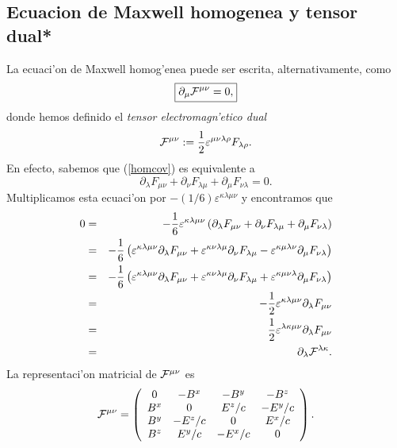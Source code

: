 \subsection{Ecuacion de Maxwell homogenea y tensor dual*}
La ecuaci'on de Maxwell homog'enea puede ser escrita, alternativamente, como
\begin{equation}
\boxed{\partial_\mu {\cal F}^{\mu\nu}=0,}
\end{equation}
donde hemos definido el \textit{tensor electromagn'etico dual}
\begin{equation}
{\cal F}^{\mu\nu}:=\frac{1}{2}\varepsilon^{\mu\nu\lambda\rho}F_{\lambda\rho} .
\end{equation}
En efecto, sabemos que (\ref{homcov}) es equivalente a
\begin{equation}
\partial_{\lambda}F_{\mu\nu}+\partial_{\nu}F_{\lambda\mu}+\partial_\mu 
F_{\nu\lambda}  =0.
\end{equation}
Multiplicamos esta ecuaci'on por $-(1/6)\varepsilon^{\kappa\lambda\mu\nu}$
y encontramos que
\begin{eqnarray}
0&=&-\frac{1}{6}\varepsilon^{\kappa\lambda\mu\nu}\left(  \partial_{\lambda}%
F_{\mu\nu}+\partial_{\nu}F_{\lambda\mu}+\partial_\mu F_{\nu\lambda}\right)\\
&=&-\frac{1}{6}\left(  \varepsilon^{\kappa\lambda\mu\nu}\partial_{\lambda}%
F_{\mu\nu}+\varepsilon^{\kappa\nu\lambda\mu}\partial_{\nu}F_{\lambda\mu
}-\varepsilon^{\kappa\mu\lambda\nu}\partial_\mu F_{\nu\lambda}\right) \\
&=&-\frac{1}{6}\left(  \varepsilon^{\kappa\lambda\mu\nu}\partial_{\lambda}%
F_{\mu\nu}+\varepsilon^{\kappa\nu\lambda\mu}\partial_{\nu}F_{\lambda\mu
}+\varepsilon^{\kappa\mu\nu\lambda}\partial_\mu F_{\nu\lambda}\right) \\
&=&-\frac{1}{2}\varepsilon^{\kappa\lambda\mu\nu}\partial_{\lambda}F_{\mu\nu} \\
&=&\frac{1}{2}\varepsilon^{\lambda\kappa\mu\nu}\partial_{\lambda}F_{\mu\nu} \\
&=&\partial_{\lambda}{\cal F}^{\lambda\kappa}  .
\end{eqnarray}
La representaci'on matricial de ${\cal F}^{\mu\nu}$ es
\begin{equation}
{\cal F}^{\mu\nu}=\left(
\begin{array}
[c]{cccc}
0 & -B^x & -B^y & -B^z\\
B^x & 0 & E^z/c & -E^y/c\\
B^y & -E^z/c & 0 & E^x/c\\
B^z & E^y/c & -E^x/c & 0
\end{array}
\right). \label{Fdualupup}
\end{equation}


